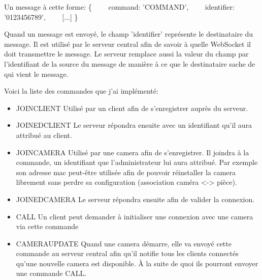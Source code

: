 \documentclass[12pt, a4paper]{report}
\begin{document}
Un message à cette forme:\newline
\{\newline
    command: 'COMMAND',\newline
    identifier: '0123456789',\newline
    [...]\newline
\}\newline

Quand un message est envoyé, le champ 'identifier' représente le destinataire du message. Il est utilisé par le serveur central afin de savoir à quelle WebSocket il doit transmettre le message. Le serveur remplace aussi la valeur du champ par l'identifiant de la source du message de manière à ce que le destinataire sache de qui vient le message.\newline

Voici la liste des commandes que j'ai implémenté:\newline
\begin{itemize}
    \item JOIN\textunderscore CLIENT\newline
        Utilisé par un client afin de s'enregistrer auprès du serveur.\newline

    \item JOINED\textunderscore CLIENT\newline
        Le serveur répondra ensuite avec un identifiant qu'il aura attribué au client.\newline

    \item JOIN\textunderscore CAMERA\newline
        Utilisé par une camera afin de s'enregistrer.
        Il joindra à la commande, un identifiant que l'administrateur lui aura attribué.
        Par exemple son adresse mac peut-être utilisée afin de pouvoir réinstaller la camera librement sans perdre sa configuration (association caméra <-> pièce).\newline

    \item JOINED\textunderscore CAMERA\newline
        Le serveur répondra ensuite afin de valider la connexion.\newline

    \item CALL\newline
        Un client peut demander à initialiser une connexion avec une camera via cette commande\newline

    \item CAMERA\textunderscore UPDATE\newline
        Quand une camera démarre, elle va envoyé cette commande au serveur central afin qu'il notifie tous les clients connectés qu'une nouvelle camera est disponible. À la suite de quoi ils pourront envoyer une commande CALL.\newline
\end{itemize}
\end{document}
